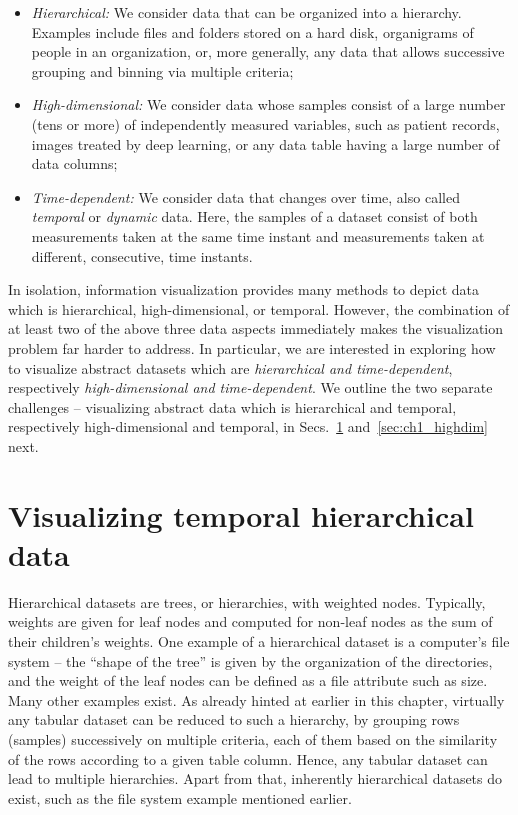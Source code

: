 \begin{itemize}
\item\emph{Hierarchical:} We consider data that can be organized into a hierarchy. Examples include files and folders stored on a hard disk, organigrams of people in an organization, or, more generally, any data that allows successive grouping and binning via multiple criteria;
\item\emph{High-dimensional:} We consider data whose samples consist of a large number (tens or more) of independently measured variables, such as patient records, images treated by deep learning, or any data table having a large number of data columns;
\item\emph{Time-dependent:} We consider data that changes over time, also called \emph{temporal} or \emph{dynamic} data. Here, the samples of a dataset consist of both measurements taken at the same time instant and measurements taken at different, consecutive, time instants. 
\end{itemize}

In isolation, information visualization provides many methods to depict data which is hierarchical, high-dimensional, or temporal. However, the combination of at least two of the above three data aspects immediately makes the visualization problem far harder to address. In particular, we are interested in exploring how to visualize abstract datasets which are \emph{hierarchical and time-dependent}, respectively \emph{high-dimensional and time-dependent}. We outline the two separate challenges -- visualizing abstract data which is hierarchical and temporal, respectively high-dimensional and temporal, in Secs.~\ref{sec:ch1_tempo} and~\ref{sec:ch1_highdim} next.



\section{Visualizing temporal hierarchical data}
\label{sec:ch1_tempo}
%
Hierarchical datasets are trees, or hierarchies, with weighted nodes. Typically, weights are given for leaf nodes and computed for non-leaf nodes as the sum of their children's weights. One example of a hierarchical dataset is a computer's file system -- the ``shape of the tree'' is given by the organization of the directories, and the weight of the leaf nodes can be defined as a file attribute such as size. Many other examples exist. As already hinted at earlier in this chapter, virtually any tabular dataset can be reduced to such a hierarchy, by grouping rows (samples) successively on multiple criteria, each of them based on the similarity of the rows according to a given table column. Hence, any tabular dataset can lead to multiple hierarchies. Apart from that, inherently hierarchical datasets do exist, such as the file system example mentioned earlier.

